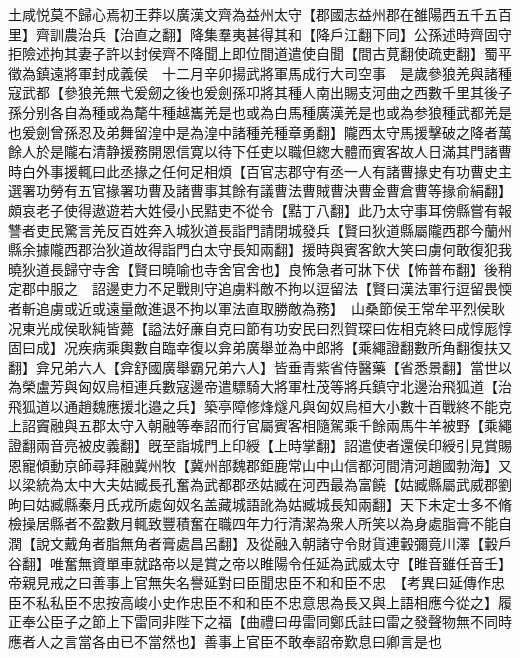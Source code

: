 土咸悦莫不歸心焉初王莽以廣漢文齊為益州太守【郡國志益州郡在雒陽西五千五百里】齊訓農治兵【治直之翻】降集羣夷甚得其和【降戶江翻下同】公孫述時齊固守拒險述拘其妻子許以封侯齊不降聞上即位間道遣使自聞【間古莧翻使疏吏翻】蜀平徵為鎮遠將軍封成義侯　十二月辛卯揚武將軍馬成行大司空事　是歲參狼羌與諸種寇武都【參狼羌無弋爰劒之後也爰劍孫卭將其種人南出賜支河曲之西數千里其後子孫分别各自為種或為氂牛種越巂羌是也或為白馬種廣漢羌是也或為参狼種武都羌是也爰劍曾孫忍及弟舞留湟中是為湟中諸種羌種章勇翻】隴西太守馬援擊破之降者萬餘人於是隴右清静援務開恩信寛以待下任吏以職但緫大體而賓客故人日滿其門諸曹時白外事援輒曰此丞掾之任何足相煩【百官志郡守有丞一人有諸曹掾史有功曹史主選署功勞有五官掾署功曹及諸曹事其餘有議曹法曹賊曹決曹金曹倉曹等掾俞絹翻】頗哀老子使得遨遊若大姓侵小民黠吏不從令【黠丁八翻】此乃太守事耳傍縣嘗有報讐者吏民驚言羌反百姓奔入城狄道長詣門請閉城發兵【賢曰狄道縣屬隴西郡今蘭州縣余據隴西郡治狄道故得詣門白太守長知兩翻】援時與賓客飲大笑曰虜何敢復犯我曉狄道長歸守寺舍【賢曰曉喻也寺舍官舍也】良怖急者可牀下伏【怖普布翻】後稍定郡中服之　詔邊吏力不足戰則守追虜料敵不拘以逗留法【賢曰漢法軍行逗留畏愞者斬追虜或近或遠量敵進退不拘以軍法直取勝敵為務】　山桑節侯王常牟平烈侯耿况東光成侯耿純皆薨【謚法好亷自克曰節有功安民曰烈賀琛曰佐相克終曰成惇厖惇固曰成】况疾病乘輿數自臨幸復以弇弟廣舉並為中郎將【乘繩證翻數所角翻復扶又翻】弇兄弟六人【弇舒國廣舉霸兄弟六人】皆垂青紫省侍醫藥【省悉景翻】當世以為榮盧芳與匈奴烏桓連兵數寇邊帝遣驃騎大將軍杜茂等將兵鎮守北邊治飛狐道【治飛狐道以通趙魏應援北邉之兵】築亭障修烽燧凡與匈奴烏桓大小數十百戰終不能克　上詔竇融與五郡太守入朝融等奉詔而行官屬賓客相隨駕乘千餘兩馬牛羊被野【乘繩證翻兩音亮被皮義翻】旣至詣城門上印綬【上時掌翻】詔遣使者還侯印綬引見賞賜恩寵傾動京師尋拜融冀州牧【冀州部魏郡鉅鹿常山中山信都河間清河趙國勃海】又以梁統為太中大夫姑臧長孔奮為武都郡丞姑臧在河西最為富饒【姑臧縣屬武威郡劉昫曰姑臧縣秦月氏戎所處匈奴名盖藏城語訛為姑臧城長知兩翻】天下未定士多不脩檢操居縣者不盈數月輒致豐積奮在職四年力行清潔為衆人所笑以為身處脂膏不能自潤【說文戴角者脂無角者膏處昌呂翻】及從融入朝諸守令財貨連轂彌竟川澤【轂戶谷翻】唯奮無資單車就路帝以是賞之帝以睢陽令任延為武威太守【睢音雖任音壬】帝親見戒之曰善事上官無失名譽延對曰臣聞忠臣不和和臣不忠　【考異曰延傳作忠臣不私私臣不忠按高峻小史作忠臣不和和臣不忠意思為長又與上語相應今從之】履正奉公臣子之節上下雷同非陛下之福【曲禮曰毋雷同鄭氏註曰雷之發聲物無不同時應者人之言當各由已不當然也】善事上官臣不敢奉詔帝歎息曰卿言是也

